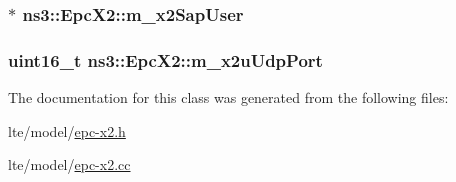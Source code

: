 \subsubsection[{\texorpdfstring{m\+\_\+x2\+Sap\+User}{m_x2SapUser}}]{$\ast$ ns3\+::\+Epc\+X2\+::m\+\_\+x2\+Sap\+User\hspace{0.3cm}{\ttfamily [protected]}}\hypertarget{classns3_1_1EpcX2_a0a74a3c19067fe18af3021c7b4c24c19}{}\label{classns3_1_1EpcX2_a0a74a3c19067fe18af3021c7b4c24c19}
\subsubsection[{\texorpdfstring{m\+\_\+x2u\+Udp\+Port}{m_x2uUdpPort}}]{\setlength{\rightskip}{0pt plus 5cm}uint16\+\_\+t ns3\+::\+Epc\+X2\+::m\+\_\+x2u\+Udp\+Port\hspace{0.3cm}{\ttfamily [private]}}\hypertarget{classns3_1_1EpcX2_aa0e3b62bf699a12b65309cb25f232974}{}\label{classns3_1_1EpcX2_aa0e3b62bf699a12b65309cb25f232974}


The documentation for this class was generated from the following files\+:\begin{DoxyCompactItemize}
\item 
lte/model/\hyperlink{epc-x2_8h}{epc-\/x2.\+h}\item 
lte/model/\hyperlink{epc-x2_8cc}{epc-\/x2.\+cc}\end{DoxyCompactItemize}
